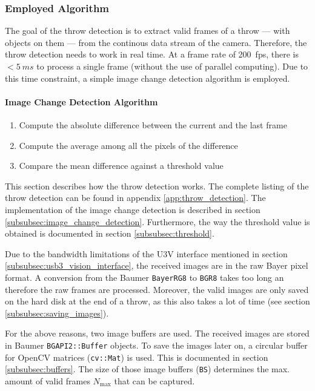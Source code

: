 \subsubsection{Employed Algorithm}
\label{subsubsec:algorithm}

The goal of the throw detection is to extract valid frames of a throw --- with objects on them --- from the continous data stream of the camera.
Therefore, the throw detection needs to work in real time.
At a frame rate of \SI{200}{fps}, there is $<\SI{5}{ms}$ to process a single frame (without the use of parallel computing).
Due to this time constraint, a simple image change detection algorithm is employed.

\paragraph{Image Change Detection Algorithm}
\vspace{-15pt}
\begin{enumerate}
  \item Compute the absolute difference between the current and the last frame
  \item Compute the average among all the pixels of the difference
  \item Compare the mean difference against a threshold value
\end{enumerate}

This section describes how the throw detection works.
The complete listing of the throw detection can be found in appendix \ref{app:throw_detection}.
The implementation of the image change detection is described in section \ref{subsubsec:image_change_detection}.
Furthermore, the way the threshold value is obtained is documented in section \ref{subsubsec:threshold}.

Due to the bandwidth limitations of the U3V interface mentioned in section \ref{subsubsec:usb3_vision_interface}, the received images are in the raw Bayer pixel format.
A conversion from the Baumer \texttt{BayerRG8} to \texttt{BGR8} takes too long an therefore the raw frames are processed.
Moreover, the valid images are only saved on the hard disk at the end of a throw, as this also takes a lot of time (see section \ref{subsubsec:saving_images}).

For the above reasons, two image buffers are used.
The received images are stored in Baumer \texttt{BGAPI2::Buffer} objects.
To save the images later on, a circular buffer for OpenCV matrices (\texttt{cv::Mat}) is used.
This is documented in section \ref{subsubsec:buffers}.
The size of those image buffers (\texttt{BS}) determines the max. amount of valid frames $N_\text{max}$ that can be captured.

